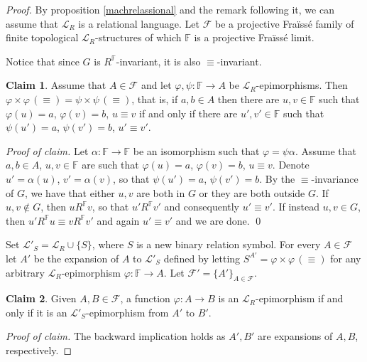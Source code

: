 \documentclass[12pt,twoside,a4paper]{amsart}
\theoremstyle{plain}
\theoremstyle{definition}
\newtheorem{claim}{Claim}[theorem]
\begin{document}
\begin{proof}
By proposition \ref{machrelassional} and the remark following it, we can assume that $ \mathcal L_R$ is a relational language.
Let $ \mathcal F $ be a projective Fra\"iss\'e family of finite topological $ \mathcal L_R$-structures of which $ \mathbb F $ is a projective Fra\"iss\'e limit.

Notice that since $G$ is $R^{ \mathbb F }$-invariant, it is also $\equiv $-invariant.

\begin{claim} \label{eightone}
Assume that $A\in \mathcal F $ and let $ {\varphi} ,\psi: \mathbb F \to A$ be $ \mathcal L_R$-epimorphisms.
Then ${\varphi} \! \times \! {\varphi} \,(\equiv )=\psi \! \times \! \psi \,(\equiv )$, that is, if $a,b\in A$ then there are $u,v\in \mathbb F $ such that $ {\varphi} (u)=a$, $ {\varphi} (v)=b$, $u\equiv v$ if and only if there are $u',v'\in \mathbb F $ such that $\psi (u')=a$, $\psi (v')=b$, $u'\equiv v'$.
\end{claim}

{\it Proof of claim.}
Let $\alpha : \mathbb F \to \mathbb F $ be an isomorphism such that $ {\varphi} =\psi\alpha $.
Assume that $a,b\in A$, $u,v\in \mathbb F $ are such that $ {\varphi} (u)=a$, $ {\varphi} (v)=b$, $u\equiv v$.
Denote $u'=\alpha (u)$, $v'=\alpha (v)$, so that $\psi (u')=a$, $\psi (v')=b$.
By the $\equiv $-invariance of $G$, we have that either $u,v$ are both in $G$ or they are both outside $G$.
If $u,v\notin G$, then $uR^{ \mathbb F }v$, so that $u'R^{ \mathbb F }v'$ and consequently $u'\equiv v'$.
If instead $u,v\in G$, then $u'R^{ \mathbb F}u\equiv vR^{ \mathbb F }v'$ and again $u'\equiv v'$ and we are done.
\qed

\medskip
Set $ \mathcal L'_S= \mathcal L_R\cup\{ S\} $, where $S$ is a new binary relation symbol.
For every $A\in \mathcal F $ let $A'$ be the expansion of $A$ to $ \mathcal L'_S$ defined by letting $S^{A'}= {\varphi} \! \times \!  {\varphi} \,(\equiv )$ for any arbitrary $ \mathcal L_R$-epimorphism $ {\varphi} : \mathbb F \to A$.
Let $ \mathcal F'=\{ A'\}_{A\in \mathcal F }$.

\begin{claim}
Given $A,B\in \mathcal F $, a function $ {\varphi} :A\to B$ is an $ \mathcal L_R$-epimorphism if and only if it is an $ \mathcal L'_S$-epimorphism from $A'$ to $B'$.
\end{claim}

{\it Proof of claim.}
The backward implication holds as $A',B'$ are expansions of $A,B$, respectively.


\end{proof}
\end{document}
